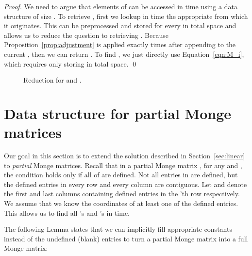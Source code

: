 \documentclass{llncs}
\begin{document}
\begin{proof}
We need to argue that elements of  can be accessed in  time using a data structure of size . To
retrieve , first we lookup in  time the appropriate  from which it originates. This
can be preprocessed and stored for every  in  total space and allows us to reduce the question to retrieving
. Because Proposition~\ref{prop:adjustment} is applied exactly  times after appending 
to the current , then we can return . To find , we just directly use Equation~\ref{eqn:M_i},
which requires only storing  in  total space.
\qed \end{proof}



\begin{figure}[htb]
\centering
{\small
\begin{minipage}[]{0.2\linewidth}




\end{minipage}
\hspace{0.5cm}
\begin{minipage}[]{0.2\linewidth}




\end{minipage}
\hspace{2cm}
\begin{minipage}[]{0.3\linewidth}

\end{minipage}
\caption{Reduction for  and .}
\label{fig:reduction}
}
\end{figure}


\section{Data structure for partial Monge matrices}
\label{sec:partial}
Our goal in this section is to extend the solution described in Section~\ref{sec:linear} to \emph{partial}
Monge matrices. Recall that in a partial Monge matrix , for any
 and , the condition  holds only if all of 
are defined. Not all entries in  are defined, but the defined
entries in every row and every column are contiguous. Let  and  denote the first and last columns containing defined entries in the 'th row respectively. 
We assume that we know the coordinates
of at least one of the defined entries. This allows us to find all 's and 's in  time.

The following Lemma states that we can implicitly fill appropriate constants instead of the undefined (blank) entries to turn a partial Monge matrix into a full Monge matrix:
 
\end{document}
